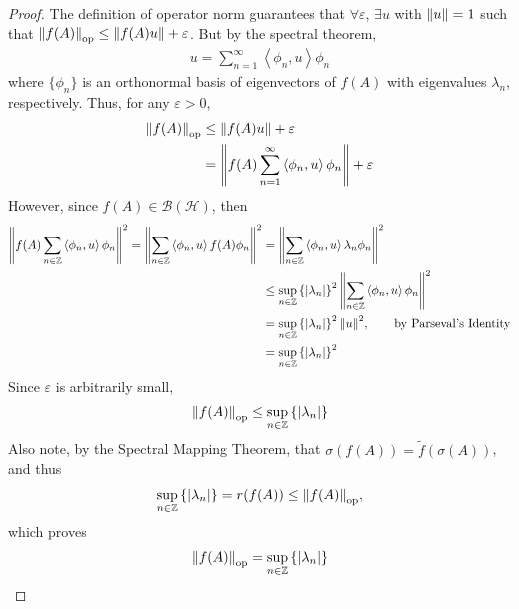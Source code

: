 \documentclass{article} %
\theoremstyle{plain}
\newcommand{\E}{\varepsilon}
\newcommand{\VEC}[2]{\left\langle #1, #2 \right\rangle}
\newcommand{\Hilb}{\mathcal{H}}
\numberwithin{equation}{section} %
\numberwithin{figure}{section} %
\numberwithin{table}{section} %
\begin{document}
\begin{proof}
    The definition of operator norm guarantees that $\forall \E$, $\exists u$ with $\norm{u} = 1$ such that $\norm{f(A)}_{\text{op}} \leq \norm{f(A)u} + \E$.  But by the spectral theorem,
    \begin{align*}
        u = \sum_{n=1}^\infty \VEC{\phi_n}{u}\phi_n
    \end{align*}
    where $\{\phi_n\}$ is an orthonormal basis of eigenvectors of $f(A)$ with eigenvalues $\lambda_n$, respectively.  Thus, for any $\E > 0$,
    \begin{align*}
        \norm{f(A)}_{\text{op}} &\leq \norm{f(A)u} + \E \\
        &= \norm{f(A)\sum_{n=1}^\infty \VEC{\phi_n}{u}\phi_n} + \E
    \end{align*}
    However, since $f(A) \in \mathcal{B}(\Hilb)$, then
    \begin{align*}
        \norm{f(A)\sum_{n\in\mathbb{Z}} \VEC{\phi_n}{u}\phi_n}^2 = \norm{\sum_{n\in\mathbb{Z}} \VEC{\phi_n}{u}f(A)\phi_n}^2 &= \norm{\sum_{n\in\mathbb{Z}} \VEC{\phi_n}{u}\lambda_n\phi_n}^2 \\
        &\leq \sup_{n\in\mathbb{Z}}\left\{|\lambda_n|\right\}^2\norm{\sum_{n\in\mathbb{Z}}\VEC{\phi_n}{u}\phi_n}^2 \\
        &= \sup_{n\in\mathbb{Z}}\left\{|\lambda_n|\right\}^2\norm{u}^2, \qquad \text{by Parseval's Identity} \\
        &= \sup_{n\in\mathbb{Z}}\left\{|\lambda_n|\right\}^2
    \end{align*}
    Since $\E$ is arbitrarily small,
    \begin{align*}
        \norm{f(A)}_\text{op} \leq \sup_{n\in\mathbb{Z}}\left\{|\lambda_n|\right\}
    \end{align*}
    Also note, by the Spectral Mapping Theorem, that $\sigma(f(A)) = \tilde{f}(\sigma(A))$, and thus
    \begin{align*}
        \sup_{n\in\mathbb{Z}}\left\{\left|\lambda_n\right|\right\} = r(f(A)) \leq \norm{f(A)}_\text{op},
    \end{align*}
    which proves
    \begin{align*}
        \norm{f(A)}_\text{op} = \sup_{n\in\mathbb{Z}}\left\{|\lambda_n|\right\}
    \end{align*}
\end{proof}
\end{document}
